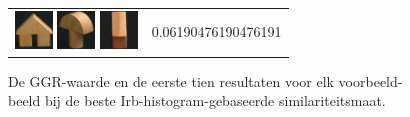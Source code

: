 \begin{figure}[tbp]
\begin{center}
\begin{tabular}{m{11cm} | m{3cm} |}
\includegraphics[width=1cm]{coil/beeld-42.eps}
\includegraphics[width=1cm]{coil/beeld-4.eps}
\includegraphics[width=1cm]{coil/beeld-44.eps}
& {\scriptsize 0.06190476190476191}
\end{tabular}
\caption{\label{fig:results_irb_histgeb}De GGR-waarde en de eerste tien resultaten voor elk voorbeeld-beeld bij de beste Irb-histogram-gebaseerde similariteitsmaat.}
\end{center}
\end{figure}

